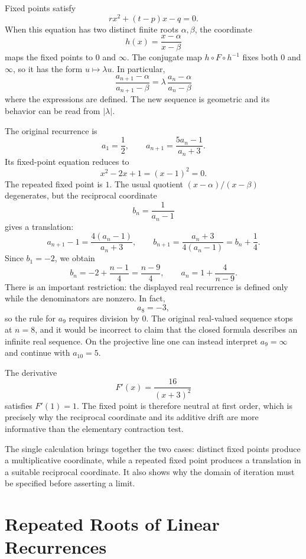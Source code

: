Fixed points satisfy
\[
 r x^2+(t-p)x-q=0.
\]
When this equation has two distinct finite roots \(\alpha,\beta\), the coordinate
\[
 h(x)=\frac{x-\alpha}{x-\beta}
\]
maps the fixed points to \(0\) and \(\infty\). The conjugate map \(h\circ F\circ h^{-1}\) fixes both \(0\) and \(\infty\), so it has the form \(u\mapsto\lambda u\). In particular,
\[
 \frac{a_{n+1}-\alpha}{a_{n+1}-\beta}
 =\lambda\,\frac{a_n-\alpha}{a_n-\beta}
\]
where the expressions are defined. The new sequence is geometric and its behavior can be read from \(|\lambda|\).

\begin{example}
The original recurrence is
\[
 a_1=\frac12,\qquad a_{n+1}=\frac{5a_n-1}{a_n+3}.
\]
Its fixed-point equation reduces to
\[
 x^2-2x+1=(x-1)^2=0.
\]
The repeated fixed point is \(1\). The usual quotient
\((x-\alpha)/(x-\beta)\) degenerates, but the reciprocal coordinate
\[
 b_n=\frac1{a_n-1}
\]
gives a translation:
\[
 a_{n+1}-1=\frac{4(a_n-1)}{a_n+3},
 \qquad
 b_{n+1}=\frac{a_n+3}{4(a_n-1)}=b_n+\frac14.
\]
Since \(b_1=-2\), we obtain
\[
 b_n=-2+\frac{n-1}{4}=\frac{n-9}{4},
 \qquad
 \boxed{a_n=1+\frac4{n-9}.}
\]
There is an important restriction: the displayed real recurrence is defined only while the denominators are nonzero. In fact,
\[
 a_8=-3,
\]
so the rule for \(a_9\) requires division by \(0\). The original real-valued sequence stops at \(n=8\), and it would be incorrect to claim that the closed formula describes an infinite real sequence. On the projective line one can instead interpret \(a_9=\infty\) and continue with \(a_{10}=5\).

The derivative
\[
 F'(x)=\frac{16}{(x+3)^2}
\]
satisfies \(F'(1)=1\). The fixed point is therefore neutral at first order, which is precisely why the reciprocal coordinate and its additive drift are more informative than the elementary contraction test.
\end{example}

The single calculation brings together the two cases: distinct fixed points produce a multiplicative coordinate, while a repeated fixed point produces a translation in a suitable reciprocal coordinate. It also shows why the domain of iteration must be specified before asserting a limit.

\section{Repeated Roots of Linear Recurrences}

